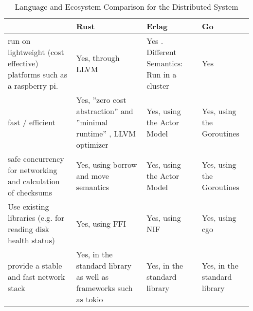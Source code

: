 \begin{sidewaystable}
	\centering
	\caption{Language and Ecosystem Comparison for the Distributed System}
	\label{language-comparison-ds}
	\begin{tabu}{X|X X X}
		\hline
		& Rust
		& Erlag
		& Go
		\\ \hline

		run on lightweight (cost effective) platforms such as a raspberry pi.
		& Yes, through LLVM \cite{rust-blog-introducing-mir}
		& Yes \cite{erlang-faq-implementations}. Different Semantics: Run in a cluster
		& Yes \cite{go-github-minimum-requirements}
		\\
		
		fast / efficient
		& Yes, ''zero cost abstraction'' and ''minimal runtime'' \cite{rustlang-org}, LLVM optimizer \cite{rust-blog-introducing-mir}
		& Yes, using the Actor Model \cite{hebert_learn_you_some_erlang}
		& Yes, using the Goroutines \cite{doxsey_introduction_2012}
		\\
		
		safe concurrency for networking and calculation of checksums
		& Yes, using borrow and move semantics \cite{rust-book-concurrency}
		& Yes, using the Actor Model \cite{hebert_learn_you_some_erlang}
        & Yes, using the Goroutines \cite{doxsey_introduction_2012}
		\\
		
		Use existing libraries (e.g. for reading disk health status)
		& Yes, using FFI \cite{rust-book-ffi}
		& Yes, using NIF \cite{erlang-org-nif}
		& Yes, using cgo \cite{golang-org-cgo}
		\\
		
		provide a stable and fast network stack
		& Yes, in the standard library as well as frameworks such as tokio \cite{tokio-rs}
		& Yes, in the standard library \cite{erlang-org}
		& Yes, in the standard library \cite{golang-org}
		\\
		
	\end{tabu}
\end{sidewaystable}

